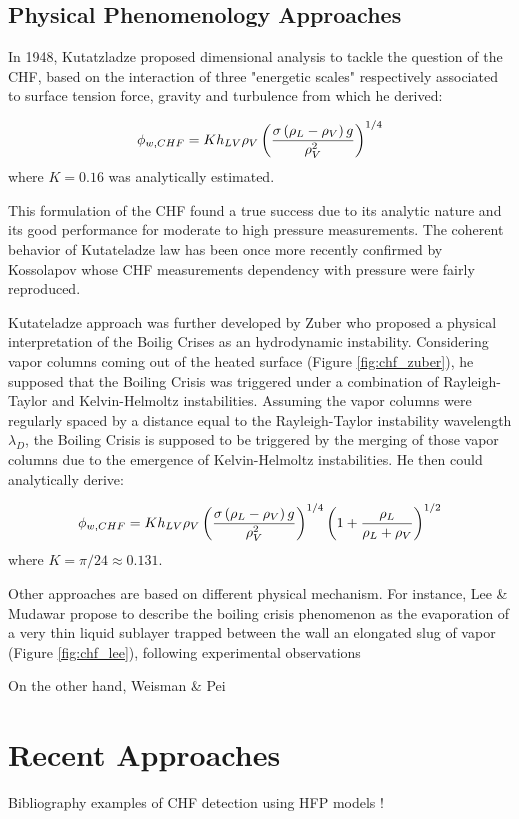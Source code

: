 \subsection{Physical Phenomenology Approaches}


In 1948, Kutatzladze \cite{kutateladze} proposed dimensional analysis to tackle the question of the CHF, based on the interaction of three "energetic scales" respectively associated to surface tension force, gravity and turbulence from which he derived:

\begin{equation}
\phi_{w,CHF} = K h_{LV} \rho_{V} \left( \frac{\sigma \left( \rho_{L} - \rho_{V} \right)g}{\rho_{V}^{2}} \right)^{1/4}
\label{eq:chf_kutateladze}
\end{equation} 
where $K=0.16$ was analytically estimated.

\npar

This formulation of the CHF found a true success due to its analytic nature and its good performance for moderate to high pressure measurements. The coherent behavior of Kutateladze law has been once more recently confirmed by Kossolapov \cite{kossolapov_experimental_2021} whose CHF measurements dependency with pressure were fairly reproduced.

\npar

Kutateladze approach was further developed by Zuber \cite{zuber_1958} who proposed a physical interpretation of the  Boilig Crises as an hydrodynamic instability. Considering vapor columns coming out of the heated surface (Figure \ref{fig:chf_zuber}), he supposed that the Boiling Crisis was triggered under a combination of Rayleigh-Taylor and Kelvin-Helmoltz instabilities. Assuming the vapor columns were regularly spaced by a distance equal to the Rayleigh-Taylor instability wavelength $\lambda_{D}$, the Boiling Crisis is supposed to be triggered by the merging of those vapor columns due to the emergence of Kelvin-Helmoltz instabilities. He then could analytically derive:

\begin{equation}
\phi_{w,CHF} = K h_{LV} \rho_{V} \left( \frac{\sigma \left( \rho_{L} - \rho_{V} \right)g}{\rho_{V}^{2}} \right)^{1/4} \left( 1 + \dfrac{\rho_{L}}{\rho_{L}+\rho_{V}} \right)^{1/2}
\label{eq:chf_zuber}
\end{equation} 
where $K=\pi / 24 \approx 0.131$.

\npar


Other approaches are based on different physical mechanism. For instance, Lee \& Mudawar \cite{lee_mudawar} propose to describe the boiling crisis phenomenon as the evaporation of a very thin liquid sublayer trapped between the wall an elongated slug of vapor (Figure \ref{fig:chf_lee}), following experimental observations %

\npar

On the other hand, Weisman \& Pei \cite{weisman_pei} 



\section{Recent Approaches}


Bibliography examples of CHF detection using HFP models !